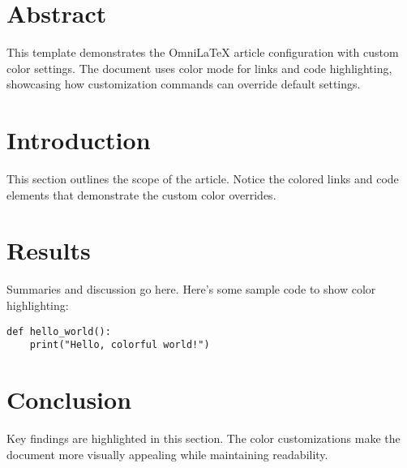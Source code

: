 \documentclass[
    language=english,
    doctype=article,
    institution=none,
    titlestyle=book,
]{../../omnilatex}
\begin{document}
\maketitle

\section*{Abstract}
This template demonstrates the OmniLaTeX article configuration with custom color settings. The document uses color mode for links and code highlighting, showcasing how customization commands can override default settings.

\tableofcontents

\section{Introduction}
This section outlines the scope of the article. Notice the colored links and code elements that demonstrate the custom color overrides.

\section{Results}
Summaries and discussion go here. Here's some sample code to show color highlighting:

\begin{verbatim}
def hello_world():
    print("Hello, colorful world!")
\end{verbatim}

\section{Conclusion}
Key findings are highlighted in this section. The color customizations make the document more visually appealing while maintaining readability.

\printbibliography
\end{document}

